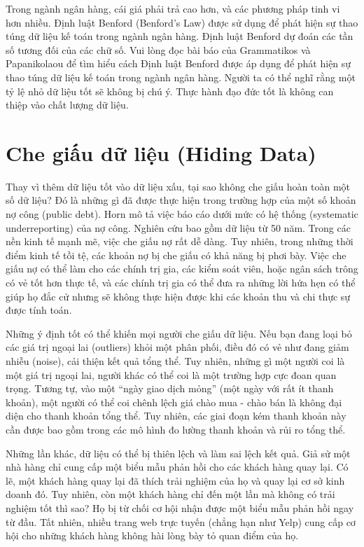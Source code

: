 Trong ngành ngân hàng, cái giá phải trả cao hơn, và các phương pháp tinh vi hơn nhiều. Định luật Benford (Benford's Law) được sử dụng để phát hiện sự thao túng dữ liệu kế toán trong ngành ngân hàng. Định luật Benford dự đoán các tần số tương đối của các chữ số. Vui lòng đọc bài báo của Grammatikos và Papanikolaou để tìm hiểu cách Định luật Benford được áp dụng để phát hiện sự thao túng dữ liệu kế toán trong ngành ngân hàng. Người ta có thể nghĩ rằng một tỷ lệ nhỏ dữ liệu tốt sẽ không bị chú ý. Thực hành đạo đức tốt là không can thiệp vào chất lượng dữ liệu.

\section{Che giấu dữ liệu (Hiding Data)}

Thay vì thêm dữ liệu tốt vào dữ liệu xấu, tại sao không che giấu hoàn toàn một số dữ liệu? Đó là những gì đã được thực hiện trong trường hợp của một số khoản nợ công (public debt). Horn mô tả việc báo cáo dưới mức có hệ thống (systematic underreporting) của nợ công. Nghiên cứu bao gồm dữ liệu từ 50 năm. Trong các nền kinh tế mạnh mẽ, việc che giấu nợ rất dễ dàng. Tuy nhiên, trong những thời điểm kinh tế tồi tệ, các khoản nợ bị che giấu có khả năng bị phơi bày. Việc che giấu nợ có thể làm cho các chính trị gia, các kiểm soát viên, hoặc ngân sách trông có vẻ tốt hơn thực tế, và các chính trị gia có thể đưa ra những lời hứa hẹn có thể giúp họ đắc cử nhưng sẽ không thực hiện được khi các khoản thu và chi thực sự được tính toán.

Những ý định tốt có thể khiến mọi người che giấu dữ liệu. Nếu bạn đang loại bỏ các giá trị ngoại lai (outliers) khỏi một phân phối, điều đó có vẻ như đang giảm nhiễu (noise), cải thiện kết quả tổng thể. Tuy nhiên, những gì một người coi là một giá trị ngoại lai, người khác có thể coi là một trường hợp cực đoan quan trọng. Tương tự, vào một ``ngày giao dịch mỏng'' (một ngày với rất ít thanh khoản), một người có thể coi chênh lệch giá chào mua - chào bán là không đại diện cho thanh khoản tổng thể. Tuy nhiên, các giai đoạn kém thanh khoản này cần được bao gồm trong các mô hình đo lường thanh khoản và rủi ro tổng thể.

Những lần khác, dữ liệu có thể bị thiên lệch và làm sai lệch kết quả. Giả sử một nhà hàng chỉ cung cấp một biểu mẫu phản hồi cho các khách hàng quay lại. Có lẽ, một khách hàng quay lại đã thích trải nghiệm của họ và quay lại cơ sở kinh doanh đó. Tuy nhiên, còn một khách hàng chỉ đến một lần mà không có trải nghiệm tốt thì sao? Họ bị từ chối cơ hội nhận được một biểu mẫu phản hồi ngay từ đầu. Tất nhiên, nhiều trang web trực tuyến (chẳng hạn như Yelp) cung cấp cơ hội cho những khách hàng không hài lòng bày tỏ quan điểm của họ.


